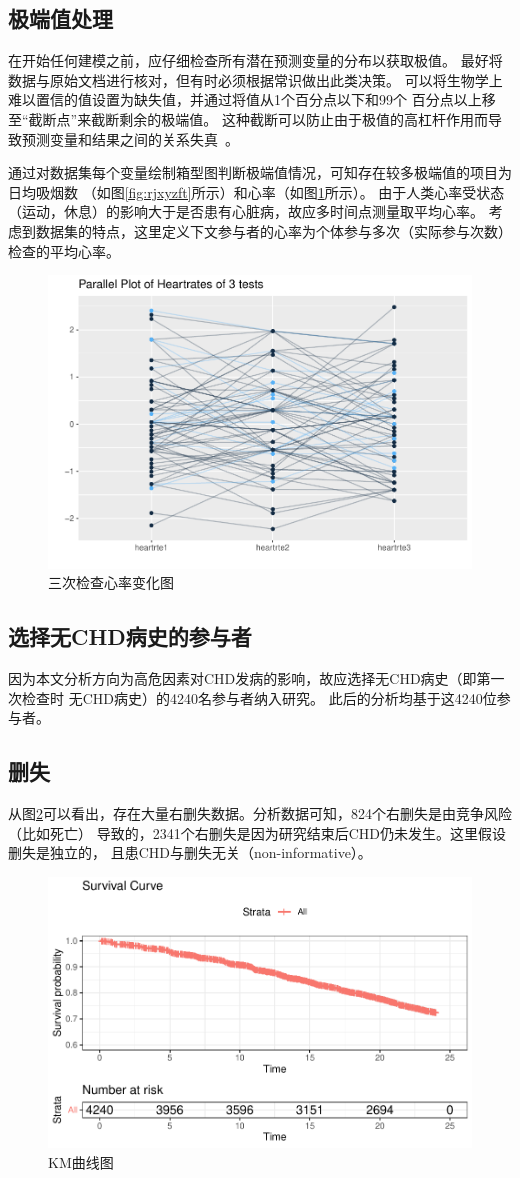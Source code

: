 \documentclass[lang=cn,11pt,a4paper,cite=super,AutoFakeBold]{elegantpaper}
\begin{document}
\subsection{极端值处理}
在开始任何建模之前，应仔细检查所有潜在预测变量的分布以获取极值。 
最好将数据与原始文档进行核对，但有时必须根据常识做出此类决策。 
可以将生物学上难以置信的值设置为缺失值，并通过将值从1个百分点以下和99个
百分点以上移至“截断点”来截断剩余的极端值。 
这种截断可以防止由于极值的高杠杆作用而导致预测变量和结果之间的关系失真~\cite{helpstar}。

通过对数据集每个变量绘制箱型图判断极端值情况，可知存在较多极端值的项目为日均吸烟数
（如图\ref{fig:rjxyzft}所示）和心率（如图\ref{fig:hrtrate}所示）。
由于人类心率受状态（运动，休息）的影响大于是否患有心脏病，故应多时间点测量取平均心率。
考虑到数据集的特点，这里定义下文参与者的心率为个体参与多次（实际参与次数）检查的平均心率。
\begin{figure}[htb]
   \centering
   \includegraphics[width=0.6\linewidth]{img/pal-1.pdf}
   \caption{三次检查心率变化图}
   \label{fig:hrtrate}
\end{figure}

\subsection{选择无CHD病史的参与者}
因为本文分析方向为高危因素对CHD发病的影响，故应选择无CHD病史（即第一次检查时
无CHD病史）的4240名参与者纳入研究。
此后的分析均基于这4240位参与者。

\subsection{删失}
从图\ref{fig:survc}可以看出，存在大量右删失数据。分析数据可知，824个右删失是由竞争风险（比如死亡）
导致的，2341个右删失是因为研究结束后CHD仍未发生。这里假设删失是独立的，
且患CHD与删失无关（non-informative）。
\begin{figure}[htb]
   \centering
   \includegraphics[width=0.6\linewidth]{img/survc.pdf}
   \caption{KM曲线图}
   \label{fig:survc}
\end{figure}
\end{document}
